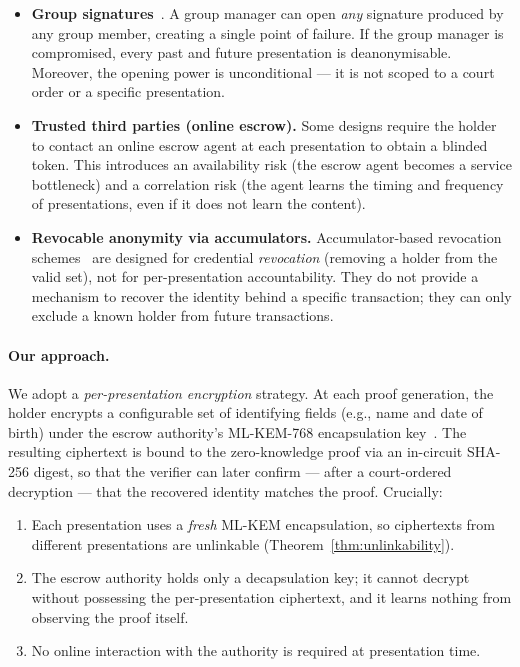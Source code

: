 \begin{itemize}
  \item \textbf{Group signatures}~\cite{camenisch2001}.
    A group manager can open \emph{any} signature produced by any group
    member, creating a single point of failure.  If the group manager is
    compromised, every past and future presentation is deanonymisable.
    Moreover, the opening power is unconditional --- it is not
    scoped to a court order or a specific presentation.

  \item \textbf{Trusted third parties (online escrow).}
    Some designs require the holder to contact an online escrow agent
    at each presentation to obtain a blinded token.  This introduces an
    availability risk (the escrow agent becomes a service bottleneck)
    and a correlation risk (the agent learns the timing and frequency
    of presentations, even if it does not learn the content).

  \item \textbf{Revocable anonymity via accumulators.}
    Accumulator-based revocation schemes~\cite{camenisch2001} are
    designed for credential \emph{revocation} (removing a holder from
    the valid set), not for per-presentation accountability.  They do
    not provide a mechanism to recover the identity behind a specific
    transaction; they can only exclude a known holder from future
    transactions.
\end{itemize}

\paragraph{Our approach.}
We adopt a \emph{per-presentation encryption} strategy.  At each
proof generation, the holder encrypts a configurable set of
identifying fields (e.g., name and date of birth) under the escrow
authority's ML-KEM-768 encapsulation key~\cite{fips203}.  The
resulting ciphertext is bound to the zero-knowledge proof via an
in-circuit SHA-256 digest, so that the verifier can later confirm ---
after a court-ordered decryption --- that the recovered identity
matches the proof.  Crucially:
\begin{enumerate}
  \item Each presentation uses a \emph{fresh} ML-KEM encapsulation,
    so ciphertexts from different presentations are unlinkable
    (Theorem~\ref{thm:unlinkability}).
  \item The escrow authority holds only a decapsulation key; it cannot
    decrypt without possessing the per-presentation ciphertext, and it
    learns nothing from observing the proof itself.
  \item No online interaction with the authority is required at
    presentation time.
\end{enumerate}


